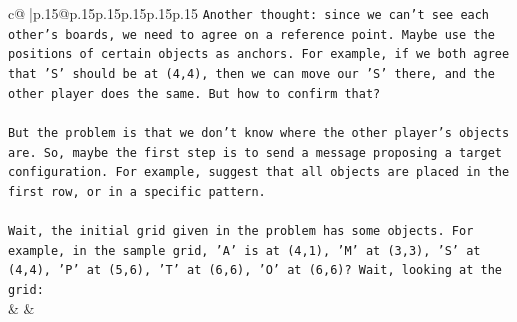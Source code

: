 \documentclass{article}
\begin{document}
{\begin{supertabular}{c@{$\;$}|p{.15\linewidth}@{}p{.15\linewidth}p{.15\linewidth}p{.15\linewidth}p{.15\linewidth}p{.15\linewidth}}
{{{\texttt{Another thought: since we can't see each other's boards, we need to agree on a reference point. Maybe use the positions of certain objects as anchors. For example, if we both agree that 'S' should be at (4,4), then we can move our 'S' there, and the other player does the same. But how to confirm that?} \\
\\ 
\texttt{But the problem is that we don't know where the other player's objects are. So, maybe the first step is to send a message proposing a target configuration. For example, suggest that all objects are placed in the first row, or in a specific pattern.} \\
\\ 
\texttt{Wait, the initial grid given in the problem has some objects. For example, in the sample grid, 'A' is at (4,1), 'M' at (3,3), 'S' at (4,4), 'P' at (5,6), 'T' at (6,6), 'O' at (6,6)? Wait, looking at the grid:} \\
            }
        }
    }
    & & \\ \\


\end{supertabular}}
\end{document}
